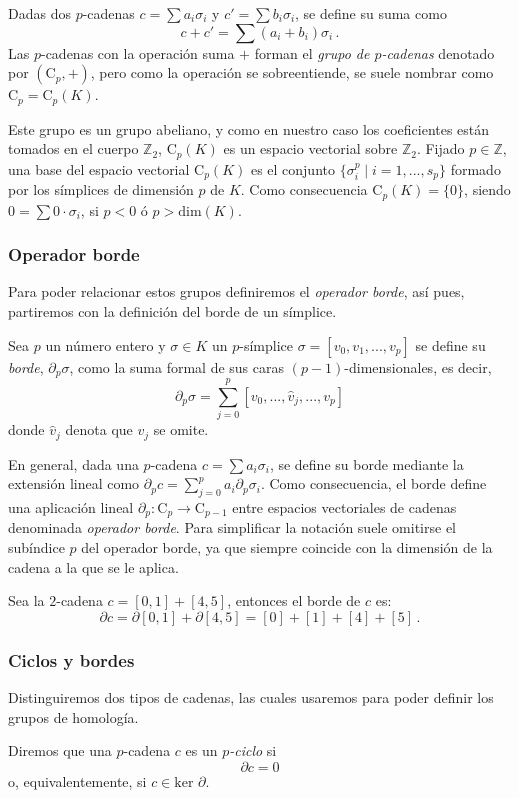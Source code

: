 Dadas dos $p$-cadenas $c = \sum a_i\sigma_i$ y $c' = \sum b_i\sigma_i$, se define su suma como
\[
c + c' = \sum (a_i + b_i)\sigma_i\,.
\]
Las $p$-cadenas con la operación suma $+$ forman el \emph{grupo de $p$-cadenas} denotado por $(\text{C}_p,+)$, pero como la operación se sobreentiende, se suele nombrar como $\text{C}_p=\text{C}_p(K)$.

Este grupo es un grupo abeliano, y como en nuestro caso los coeficientes están tomados en el cuerpo $\mathbb{Z}_2$, $\text{C}_p(K)$ es un espacio vectorial sobre $\mathbb{Z}_2$. Fijado $p \in \mathbb{Z}$, una base del espacio vectorial $\text{C}_p(K)$ es el conjunto $\{\sigma_i^p \mid i=1,...,s_p\}$ formado por los símplices de dimensión $p$ de $K$. Como consecuencia $\text{C}_p(K)=\{0\}$, siendo $0 = \sum 0\cdot\sigma_i$, si $p < 0$ ó $p > \text{dim}(K)$.

\subsubsection*{Operador borde}
Para poder relacionar estos grupos definiremos el \emph{operador borde}, así pues, partiremos con la definición del borde de un símplice.

\begin{definition}
Sea $p$ un número entero y $\sigma \in K$ un $p$-símplice $\sigma = [v_0, v_1, ..., v_p]$ se define su \emph{borde}, $\partial_p\sigma$, como la suma formal de sus caras $(p-1)$-dimensionales, es decir, 
\[
\partial_p\sigma = \sum_{j=0}^{p}[v_0, ..., \hat{v}_j, ..., v_p]
\]
donde $\hat{v}_j$ denota que $v_j$ se omite.
\end{definition}

En general, dada una $p$-cadena $c =\sum a_i\sigma_i$, se define su borde mediante la extensión lineal como  $\partial_p c= \sum_{j=0}^{p} a_i \partial_p \sigma_i$. Como consecuencia, el borde define una aplicación lineal $\partial_p: \text{C}_p \to \text{C}_{p-1}$ entre espacios vectoriales de cadenas denominada \emph{operador borde}. Para simplificar la notación suele omitirse el subíndice $p$ del operador borde, ya que siempre coincide con la dimensión de la cadena a la que se le aplica.

\begin{exmp}
Sea la $2$-cadena $c = [0,1] + [4,5]$, entonces el borde de $c$ es:
\[
\partial c = \partial [0,1] + \partial [4,5] = [0] + [1] + [4] + [5]\,.
\]
\end{exmp}

\subsubsection*{Ciclos y bordes}
Distinguiremos dos tipos de cadenas, las cuales usaremos para poder definir los grupos de homología. 
\begin{definition}
Diremos que una $p$-cadena $c$ es un \emph{$p$-ciclo} si
\[
\partial c = 0
\]
o, equivalentemente, si $c \in \text{ker }\partial$.
\end{definition}

